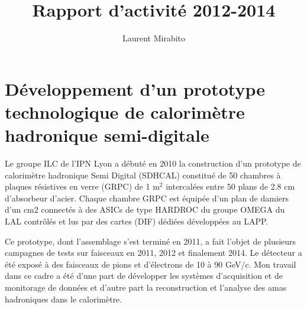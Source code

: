 \documentclass[11pt,french]{article}
\title{\textbf{Rapport d'activit\'e 2012-2014}}
\author{Laurent Mirabito}
\date{}
\begin{document}
\maketitle

\section*{D\'eveloppement d'un prototype technologique de calorim\`etre hadronique semi-digitale}

Le groupe ILC de l'IPN Lyon a d\'ebut\'e en 2010 la construction d'un prototype de
calorim\`etre hadronique Semi Digital (SDHCAL) constitu\'e de 50 chambres \`a plaques r\'esistives en verre (GRPC) de 1 m$^2$ intercal\'ees entre 50 plans de 2.8 cm d'absorbeur d'acier. 
Chaque chambre GRPC est \'equip\'ee d'un plan de damiers d'un cm2 connect\'es \`a des ASICs de type
HARDROC du groupe OMEGA du LAL contrôl\'es et lus par des cartes (DIF) d\'edi\'ees d\'evelopp\'ees au LAPP.

Ce prototype, dont l'assemblage s'est termin\'e en 2011, a fait l'objet de plusieurs campagnes de tests sur faisceaux en 2011, 2012 et finalement 2014. Le d\'etecteur a \'et\'e expos\'e à des faisceaux de pions et d'\'electrons de 10 \`a 90 GeV/c. Mon travail dans ce cadre a \'et\'e d'une part de d\'evelopper les syst\`emes d'acquisition et de monitorage de donn\'ees et d'autre part la reconstruction et l'analyse des amas hadroniques dans le calorim\`etre.
\end{document}
